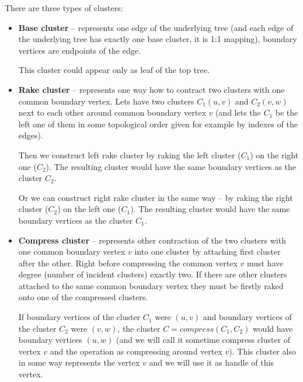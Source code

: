 There are three types of clusters:

\begin{itemize}

\item {\bf Base cluster} -- represents one edge of the underlying tree (and each
edge of the underlying tree has exactly one base cluster, it is 1:1 mapping),
boundary vertices are endpoints of the edge.

This cluster could appear only as leaf of the top tree.

\item {\bf Rake cluster} -- represents one way how to contract two clusters
with one common boundary vertex. Lets have two clusters $C_1(u,v)$ and
$C_2(v,w)$ next to each other around common boundary vertex $v$ (and lets the
$C_1$ be the left one of them in some topological order given for example by
indexes of the edges).

Then we construct {\I left rake cluster} by {\I raking} the left cluster ($C_1$)
on the right one ($C_2$). The resulting cluster would have the same boundary
vertices as the cluster $C_2$.

Or we can construct {\I right rake cluster} in the same way -- by {\I raking}
the right cluster ($C_2$) on the left one ($C_1$). The resulting cluster would
have the same boundary vertices as the cluster $C_1$.


\item{\bf Compress cluster} -- represents other contraction of the two clusters
with one common boundary vertex $v$ into one cluster by attaching first cluster
after the other. Right before compressing the common vertex $v$ must have degree
(number of incident clusters) exactly two. If there are other clusters attached
to the same common boundary vertex they must be firstly {\I raked} onto one of
the compressed clusters.

If boundary vertices of the cluster $C_1$ were $(u,v)$ and boundary vertices
of the cluster $C_2$ were $(v,w)$, the cluster $C=compress(C_1,C_2)$ would have
boundary vertices $(u,w)$ (and we will call it sometime {\I compress cluster
of vertex $v$} and the operation as {\I compressing around vertex $v$}).
This cluster also in some way represents the vertex $v$ and we will use it as
{\I handle} of this vertex.


\end{itemize}

